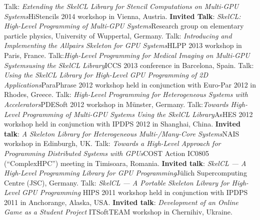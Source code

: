 \documentclass[11pt,a4paper]{moderncv}
\newcommand{\strong}[1]{\textcolor{color1}{\textbf{#1}}}
\begin{document}
         {Talk: \emph{Extending the SkelCL Library for Stencil
          Computations on Multi-GPU Systems}\newline \small HiStencils 2014
          workshop in Vienna, Austria.}
         {\strong{Invited Talk}: \emph{SkelCL\@: High-Level Programming of Multi-GPU
          Systems}\newline \small Research group on elementary particle physics,
          University of Wuppertal, Germany.}
         {Talk: \emph{Introducing and Implementing the Allpairs Skeleton for GPU
          Systems}\newline \small HLPP 2013 workshop in Paris, France.}
         {Talk:\emph{High-Level Programming for Medical Imaging on Multi-GPU
          Systems\newline using the SkelCL Library}\newline \small ICCS 2013 conference in
          Barcelona, Spain.}
       {Talk: \emph{Using the SkelCL Library for High-Level GPU Programming of
        2D Applications}\newline \small ParaPhrase 2012 workshop held in
        conjunction with Euro-Par 2012 in Rhodes, Greece.}
       {Talk: \emph{High-Level Programming for Heterogeneous Systems with
        Accelerators}\newline \small PDESoft 2012 workshop in Münster, Germany.}
       {Talk:\emph{Towards High-Level Programming of Multi-GPU Systems Using
        the SkelCL Library}\newline \small AsHES 2012 workshop held in
        conjunction with IPDPS 2012 in Shanghai, China.}
       {\strong{Invited talk}: \emph{A Skeleton Library for Heterogeneous
        Multi-/Many-Core Systems}\newline \small NAIS workshop in Edinburgh, UK.}
       {Talk: \emph{Towards a High-Level Approach for Programming Distributed
        Systems with GPUs}\newline \small COST Action IC0805 (``ComplexHPC'')
        meeting in Timisoara, Romania.}
       {\strong{Invited talk}: \emph{SkelCL --- A High-Level Programming Library for GPU
        Programming}\newline \small Jülich Supercomputing Centre (JSC), Germany.}
       {Talk: \emph{SkelCL --- A Portable Skeleton Library for High-Level
        GPU Programming}\newline
        \small HIPS 2011 workshop held in conjunction with IPDPS 2011 in
        Anchorange, Alaska, USA.}
       {\strong{Invited talk}: \emph{Development of an Online Game as a Student Project}\newline
        \small ITSoftTEAM workshop in Chernihiv, Ukraine.}
\end{document}
